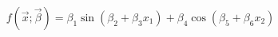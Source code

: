 

\[
f(\vec{x};\vec{\beta}) = \beta_1\sin(\beta_2 + \beta_3x_1) + \beta_4\cos(\beta_5 + \beta_6x_2)
\]


